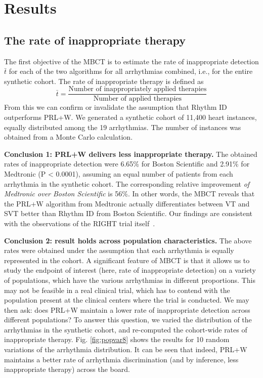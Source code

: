 \section{Results}

\subsection{The rate of inappropriate therapy}
\label{sec:rate inapp}
The first objective of the MBCT is to estimate the rate of inappropriate detection $\bar{t}$ for each of the two algorithms for all arrhythmias combined, i.e., for the entire synthetic cohort.
The rate of inappropriate therapy is defined as
\[\bar{t} = \frac{\text{Number of inappropriately applied therapies}}{\text{Number of applied therapies}}\]
From this we can confirm or invalidate the assumption that Rhythm ID outperforms PRL+W.
We generated a synthetic cohort of 11,400 heart instances, equally distributed among the 19 arrhythmias.
The number of instances was obtained from a Monte Carlo calculation.%

\textbf{Conclusion 1: PRL+W delivers less inappropriate therapy.}
The obtained rates of inappropriate detection were 6.65\% for Boston Scientific and 2.91\% for Medtronic (P < 0.0001), assuming an equal number of patients from each arrhythmia in the synthetic cohort.
The corresponding relative improvement \emph{of Medtronic over Boston Scientific} is 56\%.
In other words, the MBCT reveals that the PRL+W algorithm from Medtronic actually differentiates between VT and SVT better than Rhythm ID from Boston Scientific.
Our findings are consistent with the observations of the RIGHT trial itself~\cite{GoldABBTB11_RIGHTresults}.

\textbf{Conclusion 2: result holds across population characteristics.}
The above rates were obtained under the assumption that each arrhythmia is equally represented in the cohort.
A significant feature of MBCT is that it allows us to study the endpoint of interest (here, rate of inappropriate detection) on a variety of populations, which have the various arrhythmias in different proportions.
This may not be feasible in a real clinical trial, which has to contend with the population present at the clinical centers where the trial is conducted.
We may then ask: does PRL+W maintain a lower rate of inappropriate detection across different populations?
To answer this question, we varied the distribution of the arrhythmias in the synthetic cohort, and re-computed the cohort-wide rates of inappropriate therapy.
Fig. \ref{fig:popvar8} shows the results for 10 random variations of the arrhythmia distribution.
It can be seen that indeed, PRL+W maintains a better rate of arrhythmia discrimination (and by inference, less inappropriate therapy) across the board.

